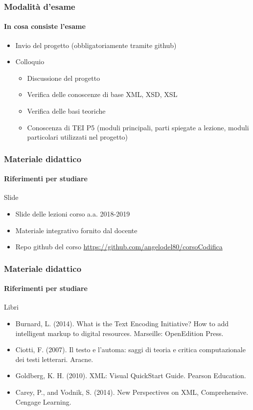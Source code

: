 \begin{frame}
	\frametitle{Modalità d’esame}
	\framesubtitle{In cosa consiste l'esame}
	\addtocounter{nframe}{1}

	\begin{itemize}
		\item Invio del progetto (obbligatoriamente tramite github)
		\item Colloquio
		      \begin{itemize}
			      \item Discussione del progetto
			      \item Verifica delle conoscenze di base XML, XSD, XSL
			      \item Verifica delle basi teoriche
			      \item Conoscenza di TEI P5 (moduli principali, parti spiegate a lezione, moduli particolari utilizzati nel progetto)
		      \end{itemize}
	\end{itemize}

\end{frame}

\begin{frame}
	\frametitle{Materiale didattico}
	\framesubtitle{Riferimenti per studiare}
	\addtocounter{nframe}{1}

	\begin{block}{Slide}
		\begin{itemize}
			\item Slide delle lezioni corso a.a. 2018-2019
			\item Materiale integrativo fornito dal docente
			\item Repo github del corso \href{https://github.com/angelodel80/corsoCodifica}{\url{https://github.com/angelodel80/corsoCodifica}}
		\end{itemize}
	\end{block}


\end{frame}

\begin{frame}
	\frametitle{Materiale didattico}
	\framesubtitle{Riferimenti per studiare}
	\addtocounter{nframe}{1}

	\begin{block}{Libri}
		\begin{itemize}
			\item Burnard, L. (2014). What is the Text Encoding Initiative? How to add intelligent markup to digital resources. Marseille: OpenEdition Press.
			\item Ciotti, F. (2007). Il testo e l’automa: saggi di teoria e critica computazionale dei testi letterari. Aracne.
			\item Goldberg, K. H. (2010). XML: Visual QuickStart Guide. Pearson Education.
			\item Carey, P., and Vodnik, S. (2014). New Perspectives on XML, Comprehensive. Cengage Learning.			
		\end{itemize}

	\end{block}
\end{frame}

